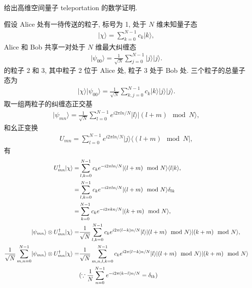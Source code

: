 \documentclass{assignment}
\begin{document}
\begin{prob}
    给出高维空间量子 teleportation 的数学证明.
\end{prob}
\begin{pf}
    假设 Alice 处有一待传送的粒子, 标号为 1, 处于 $N$ 维未知量子态
    \begin{align}
        \lvert\chi\rangle=\sum_{k=0}^{N-1}c_k\lvert k\rangle,
    \end{align}
    Alice 和 Bob 共享一对处于 $N$ 维最大纠缠态
    \begin{align}
        \lvert\psi_{00}\rangle=\frac{1}{\sqrt{N}}\sum_{j=0}^{N-1}\lvert j\rangle\lvert j\rangle.
    \end{align}
    的粒子 2 和 3, 其中粒子 2 位于 Alice 处, 粒子 3 处于 Bob 处.
    三个粒子的总量子态为
    \begin{align}
        \lvert\chi\rangle\lvert\psi_{00}\rangle=\frac{1}{\sqrt{N}}\sum_{k,j=0}^{N-1}c_k\lvert k\rangle\lvert j\rangle\lvert j\rangle.
    \end{align}
    取一组两粒子的纠缠态正交基
    \begin{align}
        \lvert\psi_{mn}\rangle=\frac{1}{\sqrt{N}}\sum_{l=0}^{N-1}e^{i2\pi ln/N}\lvert l\rangle\lvert(l+m)\mod N\rangle,
    \end{align}
    和幺正变换
    \begin{align}
        U_{mn}=\sum_{l=0}^{N-1}e^{i2\pi ln/N}\lvert j\rangle\langle(l+m)\mod N\rvert,
    \end{align}
    有
    \begin{align}
        \notag U_{mn}^{\dagger}\lvert\chi\rangle=&\sum_{l,k=0}^{N-1}c_ke^{-i2\pi ln/N}\lvert(l+m)\mod N\rangle\langle l\vert k\rangle,\\
        \notag=&\sum_{l,k=0}^{N-1}c_ke^{-i2\pi ln/N}\lvert(l+m)\mod N\rangle\delta_{lk}\\
        =&\sum_{k=0}^{N-1}c_ke^{-i2\pi kn/N}\lvert(k+m)\mod N\rangle,\\
        \lvert\psi_{mn}\rangle\otimes U_{mn}^{\dagger}\lvert\chi\rangle=&\frac{1}{\sqrt{N}}\sum_{l,k=0}^{N-1}c_ke^{i2\pi(l-k)n/N}\lvert l\rangle\lvert(l+m)\mod N\rangle\lvert(k+m)\mod N\rangle,\\
        \notag\frac{1}{\sqrt{N}}\sum_{m,n=0}^{N-1}\lvert\psi_{mn}\rangle\otimes U_{mn}^{\dagger}\lvert\chi\rangle=&\frac{1}{\sqrt{N}}\sum_{m,n,l,k=0}^{N-1}c_ke^{i2\pi(l-k)n/N}\lvert l\rangle\lvert(l+m)\mod N\rangle\lvert(k+m)\mod N\rangle\\
        \notag&(\because\frac{1}{N}\sum_{n=0}^{N-1}e^{-i2\pi(k-l)n/N}=\delta_{lk})\\

\end{align}
\end{pf}
\end{document}
